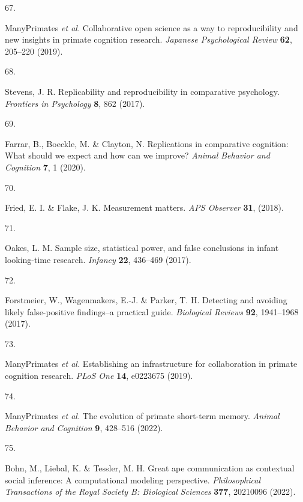 \documentclass[
  man,floatsintext]{apa6}
\newlength{\cslhangindent}
\newlength{\csllabelwidth}
\newlength{\cslentryspacingunit} %
\newenvironment{CSLReferences}[2] %
 {%
  \setlength{\parindent}{0pt}
  \ifodd #1
  \let\oldpar\par
  \def\par{\hangindent=\cslhangindent\oldpar}
  \fi
  \setlength{\parskip}{#2\cslentryspacingunit}
 }%
 {}
\newcommand{\CSLLeftMargin}[1]{\parbox[t]{\csllabelwidth}{#1}}
\newcommand{\CSLRightInline}[1]{\parbox[t]{\linewidth - \csllabelwidth}{#1}\break}
\begin{document}
\begin{CSLReferences}{0}{0}
\leavevmode{}%
\CSLLeftMargin{67. }%
\CSLRightInline{ManyPrimates \emph{et al.} Collaborative open science as a way to reproducibility and new insights in primate cognition research. \emph{Japanese Psychological Review} \textbf{62}, 205--220 (2019).}

\leavevmode{}%
\CSLLeftMargin{68. }%
\CSLRightInline{Stevens, J. R. Replicability and reproducibility in comparative psychology. \emph{Frontiers in Psychology} \textbf{8}, 862 (2017).}

\leavevmode{}%
\CSLLeftMargin{69. }%
\CSLRightInline{Farrar, B., Boeckle, M. \& Clayton, N. Replications in comparative cognition: What should we expect and how can we improve? \emph{Animal Behavior and Cognition} \textbf{7}, 1 (2020).}

\leavevmode{}%
\CSLLeftMargin{70. }%
\CSLRightInline{Fried, E. I. \& Flake, J. K. Measurement matters. \emph{APS Observer} \textbf{31}, (2018).}

\leavevmode{}%
\CSLLeftMargin{71. }%
\CSLRightInline{Oakes, L. M. Sample size, statistical power, and false conclusions in infant looking-time research. \emph{Infancy} \textbf{22}, 436--469 (2017).}

\leavevmode{}%
\CSLLeftMargin{72. }%
\CSLRightInline{Forstmeier, W., Wagenmakers, E.-J. \& Parker, T. H. Detecting and avoiding likely false-positive findings--a practical guide. \emph{Biological Reviews} \textbf{92}, 1941--1968 (2017).}

\leavevmode{}%
\CSLLeftMargin{73. }%
\CSLRightInline{ManyPrimates \emph{et al.} Establishing an infrastructure for collaboration in primate cognition research. \emph{PLoS One} \textbf{14}, e0223675 (2019).}

\leavevmode{}%
\CSLLeftMargin{74. }%
\CSLRightInline{ManyPrimates \emph{et al.} The evolution of primate short-term memory. \emph{Animal Behavior and Cognition} \textbf{9}, 428--516 (2022).}

\leavevmode{}%
\CSLLeftMargin{75. }%
\CSLRightInline{Bohn, M., Liebal, K. \& Tessler, M. H. Great ape communication as contextual social inference: A computational modeling perspective. \emph{Philosophical Transactions of the Royal Society B: Biological Sciences} \textbf{377}, 20210096 (2022).}


\end{CSLReferences}
\end{document}
